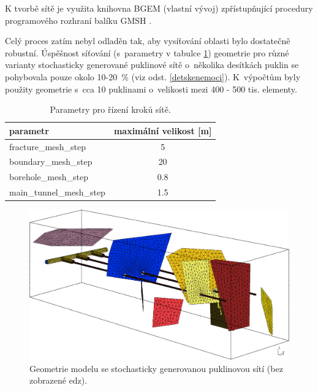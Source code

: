 \documentclass[11pt,a4paper]{article}
\newcommand{\pozn}[1]{(viz odst. \ref{#1})}
\begin{document}
\begin{onehalfspacing}
K tvorbě sítě je využita knihovna BGEM (vlastní vývoj) zpřístupňující procedury programového rozhraní balíku GMSH \cite{Geuzaine2009b}. 

Celý proces zatím nebyl odladěn tak, aby vysíťování oblasti bylo dostatečně robustní. Úspěšnost síťování (s~parametry v tabulce \ref{kroky_site}) geometrie pro různé varianty stochasticky generované puklinové sítě o~několika desítkách puklin se pohybovala pouze okolo 10-20~\% \pozn{detskenemoci}. K~výpočtům byly použity geometrie s~cca 10 puklinami o~velikosti mezi 400 - 500 tis. elementy. 

\begin{table}[ht]
\begin{center}
    \caption{Parametry pro řízení kroků sítě.}
    \begin{tabular}{ | l | c |}
    \hline
    \small parametr & \small maximální velikost [m] \\ \hline
    \small fracture\_mesh\_step & \small 5 \\ \hline
    \small boundary\_mesh\_step & \small 20 \\ \hline
    \small borehole\_mesh\_step & \small 0.8 \\ \hline
    \small main\_tunnel\_mesh\_step & \small 1.5 \\ \hline
    \end{tabular}
    \label{kroky_site}
\end{center}
\end{table}
\vspace{-0.3cm}

\begin{figure}[H]
\centering
\includegraphics[width=16cm]{graphics/obr_ralek/geom02.png}
\caption{Geometrie modelu se stochasticky generovanou puklinovou sítí (bez zobrazené edz).}
\label{geom02}
\end{figure}


\end{onehalfspacing}
\end{document}
